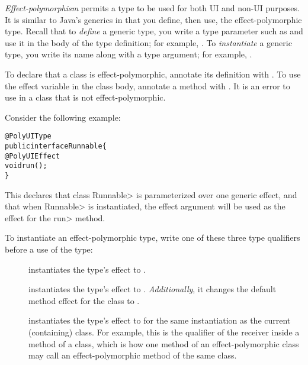 \emph{Effect-polymorphism} permits a type to be used for both UI and non-UI
purposes.  It is similar to Java's generics in that you define, then use, the
effect-polymorphic type.
Recall that to \emph{define} a generic type, you write a type parameter such as
 and use it in the body of the type definition; for example,
 .
To \emph{instantiate} a generic type, you write its name along with a type
argument; for example, .



To declare that a class is effect-polymorphic, annotate its definition with
.
To use the effect variable in the class body, annotate a method with .
It is an error to use  in a class that is not
effect-polymorphic.


Consider the following example:

\begin{alltt}
@PolyUIType
public interface Runnable \{
    @PolyUIEffect
    void run();
\}
\end{alltt}

\noindent
This declares that class \<Runnable> is parameterized over one
generic effect, and that when \<Runnable> is instantiated, the effect
argument will be used as the effect for the \<run> method.



To instantiate an effect-polymorphic type, write one of these three type
qualifiers before a use of the type:
\begin{description}
\item[]
  instantiates the type's effect to .
\item[]
  instantiates the type's effect to .
  \emph{Additionally}, it changes the
  default method effect for the class to .
\item[]
  instantiates the type's
  effect to  for the same instantiation as the current
  (containing) class.  For example, this is the qualifier of the receiver
   inside a method of a  class, which is how
  one method of an effect-polymorphic class may call an effect-polymorphic
  method of the same class.
\end{description}

